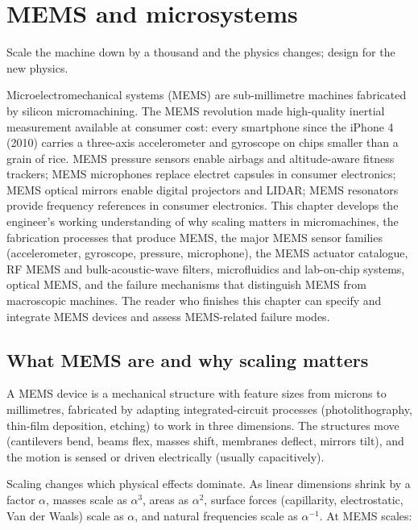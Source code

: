 \chapter{MEMS and microsystems}
\label{vol08:ch12}

\epigraph{Scale the machine down by a thousand and the physics changes; design for the new physics.}{}


\noindent
Microelectromechanical systems (MEMS) are sub-millimetre machines fabricated by silicon micromachining. The MEMS revolution made high-quality inertial measurement available at consumer cost: every smartphone since the iPhone 4 (2010) carries a three-axis accelerometer and gyroscope on chips smaller than a grain of rice. MEMS pressure sensors enable airbags and altitude-aware fitness trackers; MEMS microphones replace electret capsules in consumer electronics; MEMS optical mirrors enable digital projectors and LIDAR; MEMS resonators provide frequency references in consumer electronics. This chapter develops the engineer's working understanding of why scaling matters in micromachines, the fabrication processes that produce MEMS, the major MEMS sensor families (accelerometer, gyroscope, pressure, microphone), the MEMS actuator catalogue, RF MEMS and bulk-acoustic-wave filters, microfluidics and lab-on-chip systems, optical MEMS, and the failure mechanisms that distinguish MEMS from macroscopic machines. The reader who finishes this chapter can specify and integrate MEMS devices and assess MEMS-related failure modes.

\section{What MEMS are and why scaling matters}

A MEMS device is a mechanical structure with feature sizes from microns to millimetres, fabricated by adapting integrated-circuit processes (photolithography, thin-film deposition, etching) to work in three dimensions. The structures move (cantilevers bend, beams flex, masses shift, membranes deflect, mirrors tilt), and the motion is sensed or driven electrically (usually capacitively).

Scaling changes which physical effects dominate. As linear dimensions shrink by a factor $\alpha$, masses scale as $\alpha^3$, areas as $\alpha^2$, surface forces (capillarity, electrostatic, Van der Waals) scale as $\alpha$, and natural frequencies scale as $\alpha^{-1}$. At MEMS scales:

